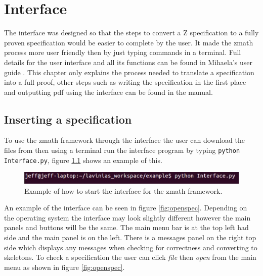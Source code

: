 \chapter{Interface}
\label{ch:interface}

The interface was designed so that the steps to convert a Z specification to a fully proven specification would be easier to complete by the user. It made the \gls{zmath} process more user friendly then by just typing commands in a terminal. Full details for the user interface and all its functions can be found in Mihaela's user guide . This chapter only explains the process needed to translate a specification into a full proof, other steps such as writing the specification in the first place and outputting pdf using the interface can be found in the manual.

\section{Inserting a specification}
To use the \gls{zmath} framework through the interface the user can download the files from \cite{zmathweb} then using a terminal run the interface program by typing \newline \verb|python Interface.py|, figure \ref{fig:startinterface} shows an example of this.

\begin{figure}[H]
\includegraphics[scale=0.6]{Figures/Interface/startinterface.png}
\caption{Example of how to start the interface for the \gls{zmath} framework. \label{fig:startinterface}}
\end{figure}

An example of the interface can be seen in figure \ref{fig:openspec}. Depending on the operating system the interface may look slightly different however the main panels and buttons will be the same. The main menu bar is at the top left had side and the main panel is on the left. There is a messages panel on the right top side which displays any messages when checking for correctness and converting to skeletons. To check a specification the user can click \emph{file} then \emph{open} from the main menu as shown in figure \ref{fig:openspec}.

